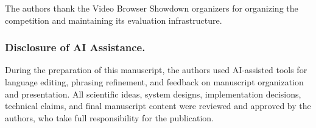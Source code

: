 \begin{credits}
\subsubsection{\ackname}
The authors thank the Video Browser Showdown organizers for organizing the
competition and maintaining its evaluation infrastructure.

\subsubsection{Disclosure of AI Assistance.}
During the preparation of this manuscript, the authors used AI-assisted tools
for language editing, phrasing refinement, and feedback on manuscript
organization and presentation. All scientific ideas, system designs,
implementation decisions, technical claims, and final manuscript content were
reviewed and approved by the authors, who take full responsibility for the
publication.
\end{credits}
